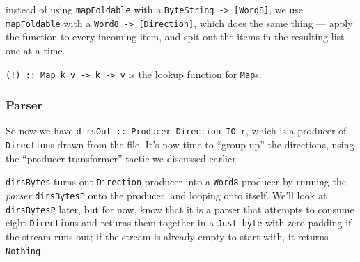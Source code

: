 \documentclass[]{article}
\newenvironment{Shaded}{}{}
\newcommand{\CommentTok}[1]{\textcolor[rgb]{0.38,0.63,0.69}{\textit{#1}}}
\newcommand{\DataTypeTok}[1]{\textcolor[rgb]{0.56,0.13,0.00}{#1}}
\newcommand{\FunctionTok}[1]{\textcolor[rgb]{0.02,0.16,0.49}{#1}}
\newcommand{\KeywordTok}[1]{\textcolor[rgb]{0.00,0.44,0.13}{\textbf{#1}}}
\newcommand{\NormalTok}[1]{#1}
\newcommand{\OperatorTok}[1]{\textcolor[rgb]{0.40,0.40,0.40}{#1}}
\newcommand{\OtherTok}[1]{\textcolor[rgb]{0.00,0.44,0.13}{#1}}
\begin{document}
instead of using \texttt{mapFoldable} with a
\texttt{ByteString\ -\textgreater{}\ {[}Word8{]}}, we use \texttt{mapFoldable}
with a \texttt{Word8\ -\textgreater{}\ {[}Direction{]}}, which does the same
thing --- apply the function to every incoming item, and spit out the items in
the resulting list one at a time.

\texttt{(!)\ ::\ Map\ k\ v\ -\textgreater{}\ k\ -\textgreater{}\ v} is the
lookup function for \texttt{Map}s.

\subsubsection{Parser}\label{parser}

So now we have \texttt{dirsOut\ ::\ Producer\ Direction\ IO\ r}, which is a
producer of \texttt{Direction}s drawn from the file. It's now time to ``group
up'' the directions, using the ``producer transformer'' tactic we discussed
earlier.

\begin{Shaded}
\end{Shaded}

\texttt{dirsBytes} turns out \texttt{Direction} producer into a \texttt{Word8}
producer by running the \emph{parser} \texttt{dirsBytesP} onto the producer, and
looping onto itself. We'll look at \texttt{dirsBytesP} later, but for now, know
that it is a parser that attempts to consume eight \texttt{Direction}s and
returns them together in a \texttt{Just\ byte} with zero padding if the stream
runs out; if the stream is already empty to start with, it returns
\texttt{Nothing}.
\end{document}
